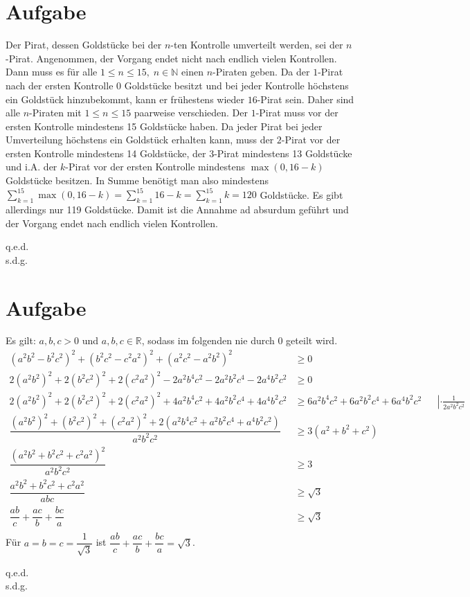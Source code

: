 \documentclass{article}
\newcommand{\myqed}{\begin{flushright} q.e.d.\\ s.d.g.\end{flushright}}
\begin{document}
    \section{Aufgabe}
    Der Pirat, dessen Goldstücke bei der $n$-ten Kontrolle umverteilt werden, sei der $n$-Pirat. Angenommen, der Vorgang endet nicht nach endlich vielen Kontrollen. Dann muss es für alle $1\leq n\leq 15,\; n\in \mathbb{N}$ einen $n$-Piraten geben. Da der $1$-Pirat nach der ersten Kontrolle $0$ Goldstücke besitzt und bei jeder Kontrolle höchstens ein Goldstück hinzubekommt, kann er frühestens wieder $16$-Pirat sein. Daher sind alle $n$-Piraten mit $1\leq n\leq 15$ paarweise verschieden. Der $1$-Pirat muss vor der ersten Kontrolle mindestens 15 Goldstücke haben. Da jeder Pirat bei jeder Umverteilung höchstens ein Goldstück erhalten kann, muss der $2$-Pirat vor der ersten Kontrolle mindestens 14 Goldstücke, der $3$-Pirat mindestens 13 Goldstücke und i.A. der $k$-Pirat vor der ersten Kontrolle mindestens $\max(0,16-k)$ Goldstücke besitzen.
    In Summe benötigt man also mindestens $\sum_{k = 1}^15 \max(0,16-k)= \sum_{k = 1}^{15} 16-k =  \sum_{k = 1}^{15} k =  120$ Goldstücke.
    Es gibt allerdings nur 119 Goldstücke. Damit ist die Annahme ad absurdum geführt und der Vorgang endet nach endlich vielen Kontrollen.\myqed
    \newpage
    \section{Aufgabe}
    Es gilt: $a,b,c>0$ und $a,b,c \in \mathbb{R}$, sodass im folgenden nie durch 0 geteilt wird.
    \begin{align*}
        (a^2b^2-b^2c^2)^2+(b^2c^2-c^2a^2)^2+(a^2c^2-a^2b^2)^2&\geq 0\\
        2(a^2b^2)^2+2(b^2c^2)^2+2(c^2a^2)^2 - 2a^2b^4c^2-2a^2b^2c^4-2a^4b^2c^2&\geq 0\\
        2(a^2b^2)^2+2(b^2c^2)^2+2(c^2a^2)^2+4a^2b^4c^2+4a^2b^2c^4+4a^4b^2c^2&\geq 6a^2b^4c^2+6a^2b^2c^4+6a^4b^2c^2&&\left|\cdot \frac{1}{2a^2b^2c^2}\right.\\
        \dfrac{(a^2b^2)^2+(b^2c^2)^2+(c^2a^2)^2+ 2\left(a^2b^4c^2+a^2b^2c^4+a^4b^2c^2\right)}{a^2b^2c^2}&\geq 3\left(a^2+b^2+c^2\right)\\
        \dfrac{\left(a^2b^2+b^2c^2+c^2a^2\right)^2}{a^2b^2c^2} &\geq 3\\
        \dfrac{a^2b^2+b^2c^2+c^2a^2}{abc} &\geq \sqrt{3}\\
        \dfrac{a b}{c} + \dfrac{a c}{b} + \dfrac{b c}{a} &\geq \sqrt{3}\\
    \end{align*}
    Für $a=b=c=\dfrac{1}{\sqrt{3}}$ ist $\dfrac{a b}{c} + \dfrac{a c}{b} + \dfrac{b c}{a} = \sqrt{3}$.\myqed
    \newpage
\end{document}
